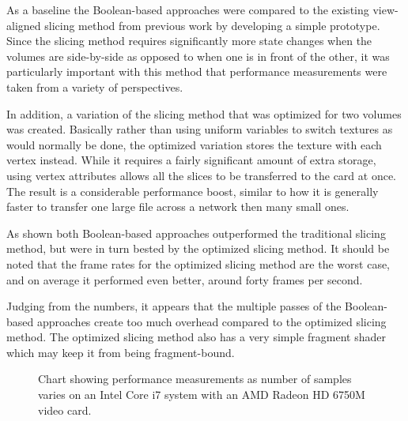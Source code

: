 \documentclass{report}
\begin{document}
As a baseline the Boolean-based approaches were compared to the existing
view-aligned slicing method from previous work by developing a simple prototype.
Since the slicing method requires significantly more state changes when the
volumes are side-by-side as opposed to when one is in front of the other, it was
particularly important with this method that performance measurements were taken
from a variety of perspectives.

In addition, a variation of the slicing method that was optimized for two
volumes was created.  Basically rather than using uniform variables to switch
textures as would normally be done, the optimized variation stores the texture
with each vertex instead.  While it requires a fairly significant amount of
extra storage, using vertex attributes allows all the slices to be transferred
to the card at once.  The result is a considerable performance boost, similar to
how it is generally faster to transfer one large file across a network then many
small ones.

As shown both Boolean-based approaches outperformed the traditional slicing
method, but were in turn bested by the optimized slicing method.  It should be
noted that the frame rates for the optimized slicing method are the worst case,
and on average it performed even better, around forty frames per second.

Judging from the numbers, it appears that the multiple passes of the
Boolean-based approaches create too much overhead compared to the optimized
slicing method.  The optimized slicing method also has a very simple fragment
shader which may keep it from being fragment-bound.

\begin{figure}
\centering
{}
\caption{
Chart showing performance measurements as number of samples varies on an Intel
Core i7 system with an AMD Radeon HD 6750M video card.
}
\label{macbook-performance-chart}
\end{figure}
\end{document}
